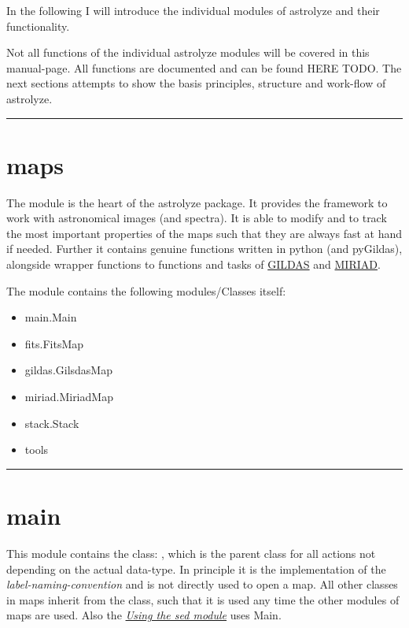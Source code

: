 \documentclass[letterpaper,10pt,english]{sphinxhowto}
\begin{document}
In the following I will introduce the individual modules of astrolyze and their
functionality.

Not all functions of the individual astrolyze modules will be covered in this
manual-page. All functions are documented and can be found HERE TODO.  The next
sections attempts to show the basis principles, structure and work-flow of
astrolyze.


\bigskip\hrule{}\bigskip



\section{maps}
\label{manual:maps}
The  module is the heart of the astrolyze package. It provides the
framework to work with astronomical images (and spectra). It is able to modify
and to track the most important properties of the maps such that they are always
fast at hand if needed. Further it contains genuine functions written in python
(and pyGildas), alongside wrapper functions to functions and tasks of {\hyperref[manual:gildas]{GILDAS}}
and {\hyperref[manual:miriad]{MIRIAD}}.

The  module contains the following modules/Classes itself:
\begin{itemize}
\item {} 
main.Main

\item {} 
fits.FitsMap

\item {} 
gildas.GilsdasMap

\item {} 
miriad.MiriadMap

\item {} 
stack.Stack

\item {} 
tools

\end{itemize}


\bigskip\hrule{}\bigskip



\section{main}
\label{manual:main}
This module contains the class: , which
is the parent class for all actions not depending on the actual data-type. In
principle it is the implementation of the \emph{label-naming-convention} and is
not directly used to open a map. All other classes in maps inherit from the
 class, such that it is used any time
the other modules of maps are used. Also the {\hyperref[manual:label-sed-module]{\emph{Using the sed module}}} uses Main.
\end{document}

